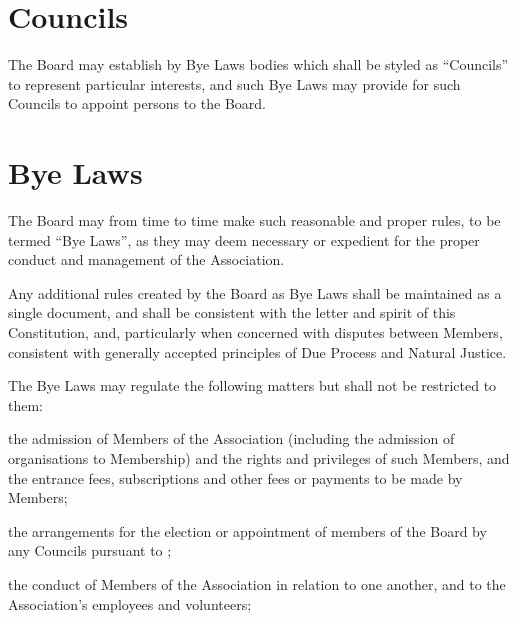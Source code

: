 \documentclass[10pt]{mk-articles-of-association}
\newcommand{\EC}[0]{Board}
\newcommand{\Exec}[0]{\EC{} }
\begin{document}


\section{Councils}
\label{councils}

The \EC{} may establish by Bye Laws bodies which
  shall be styled as ``Councils'' to represent particular interests, and
  such Bye Laws may provide for such Councils to appoint persons to
  the \EC{}.


\newpage

\section{Bye Laws}

\begin{constenum}

\item The \Exec may from time to time make such reasonable and proper
  rules, to be termed ``Bye Laws'', as they may deem necessary or
  expedient for the proper conduct and management of the Association.

\item Any additional rules created by the \Exec as Bye Laws
  shall be maintained as a single document, and shall be
  consistent with the letter and spirit of this Constitution, and,
  particularly when concerned with disputes between Members,
  consistent with generally accepted principles of Due Process and
  Natural Justice.

\item The Bye Laws may regulate the following matters but shall not be
  restricted to them:

\begin{constenum}

\item the admission of Members of the Association (including the admission
  of organisations to Membership) and the rights and privileges of
  such Members, and the entrance fees, subscriptions and other fees or
  payments to be made by Members;

\item the arrangements for the election or appointment of members of
  the \Exec by any Councils pursuant to
  ;

\item the conduct of Members of the Association in relation to one
  another, and to the Association's employees and volunteers;


\end{constenum}
\end{constenum}
\end{document}
